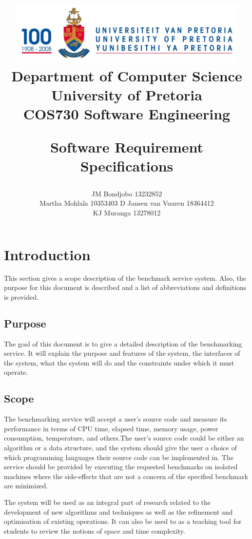 \documentclass[a4paper,12pt]{article}
\title{\includegraphics[width=12cm]{Eeufeeslogo.jpg} \\
       Department of Computer Science \\
       University of Pretoria \\
       \vspace{0.5cm}
       COS730 Software Engineering \\
       \vspace{0.5cm}
       \begin{large} \textbf{Software Requirement Specifications}\end{large}}
\date{}
\author{	JM Bondjobo		13232852 		\\
		Martha Mohlala		10353403
		D Jansen van Vuuren	18364412
		 \\
		 KJ Muranga         13278012        \\
}
\begin{document}
\maketitle
\thispagestyle{empty}
\clearpage

\newpage
{}
\thispagestyle{empty}
\tableofcontents
\clearpage

\newpage
{}

\section {Introduction}
This section gives a scope description of the benchmark service system. Also, the purpose for this document is described and a list of abbreviations and definitions is provided.
\subsection{Purpose}
The goal of this document is to give a detailed description of the  benchmarking service. It will explain the purpose and features of the system, the interfaces of the system, what the system will do and the constraints under which it must operate.


\subsection{Scope}
The benchmarking service will accept a user's source code and measure its performance in terms of CPU time, elapsed time, memory usage, power consumption, temperature, and others.The user's source code could be either an algorithm or a data structure, and the system should give the user a choice of which programming languages their source code can be implemented in. The service should be provided by executing the requested benchmarks on isolated machines where the side-effects that are not a concern of the specified benchmark are minimized.

The system will be used as an integral part of research related to the development of new algorithms and techniques as well as the refinement and optimisation of existing operations. It can also be used to as a teaching tool for students to review the notions of space and time complexity.
\end{document}
